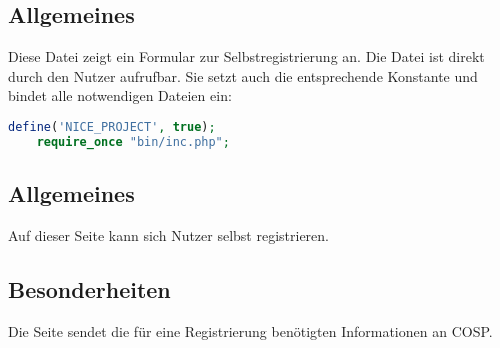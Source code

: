\subsection{Allgemeines} Diese Datei zeigt ein Formular zur Selbstregistrierung an.
Die Datei ist direkt durch den Nutzer aufrufbar. Sie setzt auch die entsprechende Konstante und bindet alle notwendigen Dateien ein:
\begin{lstlisting}[language=php]
	define('NICE_PROJECT', true);
	require_once "bin/inc.php";
\end{lstlisting}
\subsection{Allgemeines}
Auf dieser Seite kann sich Nutzer selbst registrieren.
\subsection{Besonderheiten}
Die Seite sendet die für eine Registrierung benötigten Informationen an {\glqq COSP\grqq}.